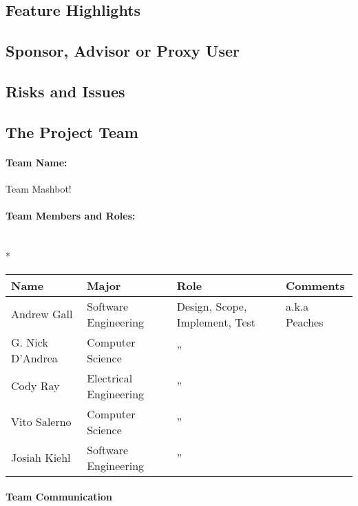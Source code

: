 \documentclass{article}
\begin{document}
\subsection*{Feature Highlights}

\subsection*{Sponsor, Advisor or Proxy User}

\subsection*{Risks and Issues}
\subsection*{The Project Team}
\paragraph{Team Name:} Team Mashbot!
\paragraph{Team Members and Roles:} \hspace*{\fill} \\*
\begin{tabular}{|l|l|l|l|}
\hline
Name & Major & Role & Comments \\ \hline
Andrew Gall & Software Engineering & Design, Scope, Implement, Test & a.k.a Peaches \\ \hline
G. Nick D'Andrea & Computer Science & \hspace*{\fill}''\hspace*{\fill} &  \\ \hline
Cody Ray & Electrical Engineering & \hspace*{\fill}''\hspace*{\fill} &  \\ \hline
Vito Salerno & Computer Science & \hspace*{\fill}''\hspace*{\fill} &  \\ \hline
Josiah Kiehl & Software Engineering & \hspace*{\fill}''\hspace*{\fill} & \\ \hline
\end{tabular}

\paragraph{Team Communication}
\end{document}
